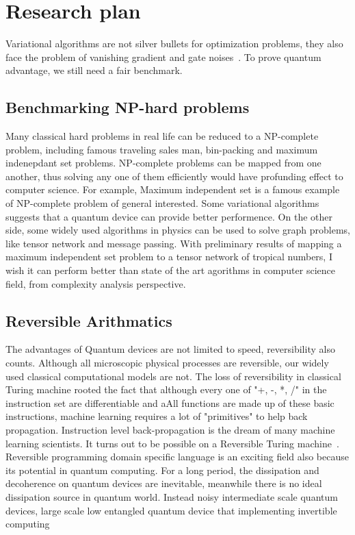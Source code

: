 \documentclass[aps,longbibliography,english,superscriptaddress]{revtex4-1}
\begin{document}
\section{Research plan}
Variational algorithms are not silver bullets for optimization problems, they also face the problem of vanishing gradient and gate noises~\cite{McClean2018}.
To prove quantum advantage, we still need a fair benchmark.

\subsection{Benchmarking NP-hard problems}
Many classical hard problems in real life can be reduced to a NP-complete problem, including famous traveling sales man, bin-packing and maximum indenepdant set problems. NP-complete problems can be mapped from one another, thus solving any one of them efficiently would have profunding effect to computer science.
For example, Maximum independent set is a famous example of NP-complete problem of general interested. Some variational algorithms suggests that a quantum device can provide better performence.
On the other side, some widely used algorithms in physics can be used to solve graph problems, like tensor network and message passing.
With preliminary results of mapping a maximum independent set problem to a tensor network of tropical numbers, I wish it can perform better than state of the art agorithms in computer science field, from complexity analysis perspective.

\subsection{Reversible Arithmatics}
The advantages of Quantum devices are not limited to speed, reversibility also counts.
Although all microscopic physical processes are reversible, our widely used classical computational models are not.
The loss of reversibility in classical Turing machine rooted the fact that although every one of "+, -, *, /" in the instruction set are differentiable and aAll functions are made up of these basic instructions, machine learning requires a lot of "primitives" to help back propagation.
Instruction level back-propagation is the dream of many machine learning scientists. It turns out to be possible on a Reversible Turing machine~\cite{Perumalla2013}.
Reversible programming domain specific language is an exciting field also because its potential in quantum computing.
For a long period, the dissipation and decoherence on quantum devices are inevitable, meanwhile there is no ideal dissipation source in quantum world.
Instead noisy intermediate scale quantum devices, large scale low entangled quantum device that implementing invertible computing 



\appendix
\end{document}
